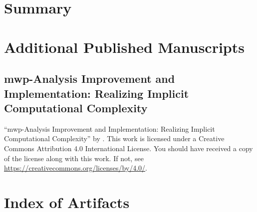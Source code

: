 \chapter{Summary}\label{ch:summary}
\clearpage\newsectoff\newsect

\printbibliography[label=chap:references, title=References, heading=bibnumbered]

\appendix
\continousappendix

\chapter{Additional Published Manuscripts}\label{app:additional-manuscripts}

    \section{mwp-Analysis Improvement and Implementation: Realizing Implicit
    Computational Complexity}\label{sec:fscd}
    \pageIconAnalysis
    {\par\enquote{mwp-Analysis Improvement and Implementation: Realizing
    Implicit Computational Complexity}
    \textcopyright{ }by{ }\CTNT.
    \newline{}This work is licensed under a Creative Commons Attribution 4.0
    International License.
    \newline{}You should have received a copy of the license along with this work.
    \newline{}If not, see \url{https://creativecommons.org/licenses/by/4.0/}.}
    
    \clearpage

\chapter{Index of Artifacts}\label{app:sec:artifacts}

\clearpage

